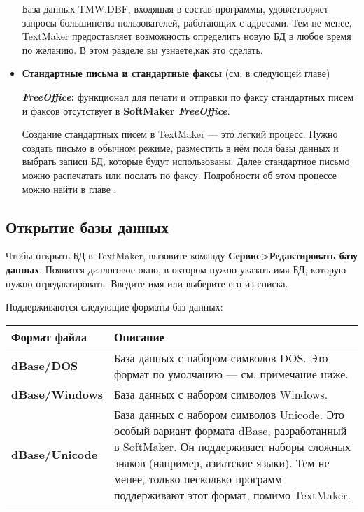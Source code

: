 ﻿\documentclass[a4paper,10pt]{article}
\begin{document}
\begin{itemize}
База данных TMW.DBF, входящая в состав программы, удовлетворяет запросы большинства пользователей, работающих с адресами. Тем не менее, TextMaker предоставляет возможность определить новую БД в любое время по желанию. В этом разделе вы узнаете,как это сделать.
\item \textbf{Стандартные письма и стандартные факсы} (см. в следующей главе)\\
 \begin{mdframed}[backgroundcolor=pink!50]
\textbf{\textit{FreeOffice}:} функционал для печати и отправки по факсу стандартных писем и факсов отсутствует в \textbf{SoftMaker \textit{FreeOffice}}.
\end{mdframed}
Создание стандартных писем в TextMaker — это лёгкий процесс. Нужно создать письмо в обычном режиме, разместить в нём поля базы данных и выбрать записи БД, которые будут использованы. Далее стандартное письмо можно распечатать или послать по факсу. Подробности об этом процессе можно найти в главе .
\end{itemize}

\subsection{Открытие базы данных}
Чтобы открыть БД в TextMaker, вызовите команду \textbf{Сервис>Редактировать базу данных}. Появится диалоговое окно, в октором нужно указать имя БД, которую нужно отредактировать.  Введите имя или выберите его из списка.

Поддерживаются следующие форматы баз данных:

\begin{center}
\begin{tabular}{  m{4cm}  m{12cm}  }
 \textbf{Формат файла} & \textbf{Описание}\\ 
 \hline
  \textbf{dBase/DOS} & База данных с набором символов DOS. Это формат по умолчанию — см. примечание ниже.\\
  \textbf{dBase/Windows} & База данных с набором символов Windows.\\ 
\textbf{dBase/Unicode} & База данных с набором символов Unicode. Это особый вариант формата dBase, разработанный в SoftMaker. Он поддерживает наборы сложных знаков (например, азиатские языки). Тем не менее, только несколько программ поддерживают этот формат, помимо TextMaker.\\
\end{tabular}
\end{center}
\end{document}
